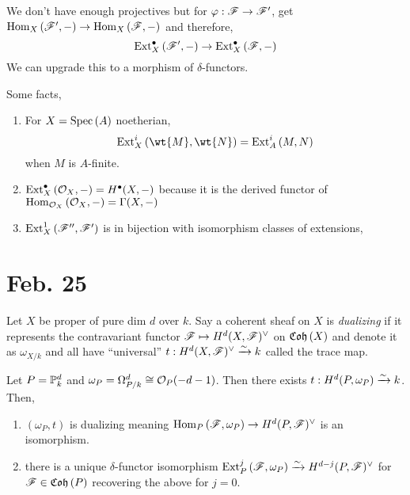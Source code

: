 \documentclass[12pt]{article}
\begin{document}
\begin{rmk}
We don't have enough projectives but for $\varphi : \F \to \F'$, get $\Hom{X}{\F'}{-} \to \Hom{X}{\F}{-}$ and therefore,
\[ \Ext{\bullet}{X}{\F'}{-} \to \Ext{\bullet}{X}{\F}{-} \]
We can upgrade this to a morphism of $\delta$-functors.
\end{rmk}

\begin{rmk}
Some facts,
\begin{enumerate}
\item For $X = \Spec{A}$ noetherian,
\[ \Ext{i}{X}{\wt{M}}{\wt{N}} = \Ext{i}{A}{M}{N} \]
when $M$ is $A$-finite. 

\item $\Ext{\bullet}{X}{\struct{X}}{-} = H^\bullet(X, -)$ because it is the derived functor of $\Hom{\struct{X}}{\struct{X}}{-} = \Gamma(X, -)$

\item $\Ext{1}{X}{\F''}{\F'}$ is in bijection with isomorphism classes of extensions,
\begin{center}
\end{center}
\end{enumerate}
\end{rmk}

\section{Feb. 25}

Let $X$ be proper of pure dim $d$ over $k$. Say a coherent sheaf on $X$ is \textit{dualizing} if it represents the contravariant functor $\F \mapsto H^d(X, \F)^\vee$ on $\Coh{X}$ and denote it as $\omega_{X/k}$ and all have ``universal'' $t : H^d(X, \F)^\vee \iso k$ called the trace map. 

\begin{prop}
Let $P = \P^d_k$ and $\omega_P = \Omega^d_{P/k} \cong \struct{P}(-d-1)$. Then there exists $t : H^d(P, \omega_P) \iso k$. Then,
\begin{enumerate}
\item $(\omega_P, t)$ is dualizing meaning $\Hom{P}{\F}{\omega_P} \to H^d(P, \F)^\vee$ is an isomorphism.

\item there is a unique $\delta$-functor isomorphism $\Ext{j}{P}{\F}{\omega_P} \iso H^{d-j}(P, \F)^\vee$ for $\F \in \Coh{P}$ recovering the above for $j = 0$.
\end{enumerate}
\end{prop}
\end{document}
